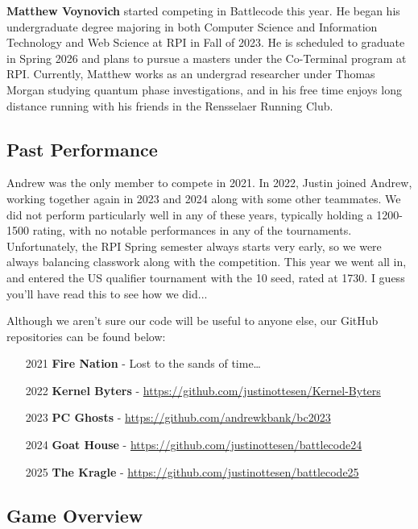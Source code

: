 \medskip

\textbf{Matthew Voynovich} started competing in Battlecode this year. He began his undergraduate degree majoring in both Computer Science and Information Technology and Web Science at RPI in Fall of 2023. He is scheduled to graduate in Spring 2026 and plans to pursue a masters under the Co-Terminal program at RPI. Currently, Matthew works as an undergrad researcher under Thomas Morgan studying quantum phase investigations, and in his free time enjoys long distance running with his friends in the Rensselaer Running Club.

\newpage
\subsection{Past Performance}

Andrew was the only member to compete in 2021. In 2022, Justin joined Andrew, working together again in 2023 and 2024 along with some other teammates. We did not perform particularly well in any of these years, typically holding a 1200-1500 rating, with no notable performances in any of the tournaments. Unfortunately, the RPI Spring semester always starts very early, so we were always balancing classwork along with the competition. This year we went all in, and entered the US qualifier tournament with the 10 seed, rated at 1730. I guess you'll have read this to see how we did...

\medskip

Although we aren't sure our code will be useful to anyone else, our GitHub repositories can be found below:
\begin{enumerate}
  \item[2021] \textbf{Fire Nation} - Lost to the sands of time\dots
  \item[2022] \textbf{Kernel Byters} - \url{https://github.com/justinottesen/Kernel-Byters}
  \item[2023] \textbf{PC Ghosts} - \url{https://github.com/andrewkbank/bc2023}
  \item[2024] \textbf{Goat House} - \url{https://github.com/justinottesen/battlecode24}
  \item[2025] \textbf{The Kragle} - \url{https://github.com/justinottesen/battlecode25}
\end{enumerate}

\subsection{Game Overview}

